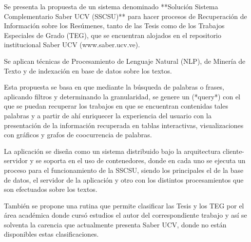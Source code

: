 Se presenta la propuesta de un sistema denominado **Solución Sistema Complementario Saber UCV (SSCSU)** para hacer procesos de Recuperación de Información sobre los Resúmenes, tanto de las Tesis como de los Trabajos Especiales de Grado (TEG), que se encuentran alojados en el repositorio institucional Saber UCV (www.saber.ucv.ve).

Se aplican técnicas de Procesamiento de Lenguaje Natural (NLP), de Minería de Texto y de indexación en base de datos sobre los textos.

Esta propuesta se basa en que mediante la búsqueda de palabras o frases, aplicando filtros y determinando la granularidad, se genere un (*query*) con el que se puedan recuperar los trabajos en que se encuentran contenidas tales palabras y  a partir de ahí enriquecer la experiencia del usuario con la presentación de la información recuperada en tablas interactivas, visualizaciones con gráficos y grafos de coocurrencia de palabras.

La aplicación se diseña como un sistema distribuido bajo la arquitectura cliente-servidor y se soporta en el uso de contenedores, donde en cada uno se ejecuta un proceso para el funcionamiento de la SSCSU, siendo los principales el de la base de datos, el servidor de la aplicación y otro con los distintos procesamientos que son efectuados sobre los textos.

También se propone una rutina que permite clasificar las Tesis y los TEG por el área académica donde cursó estudios el autor del correspondiente trabajo y así se solventa la carencia que actualmente presenta Saber UCV, donde no están disponibles estas clasificaciones.

\thispagestyle{empty}

\maketitle


